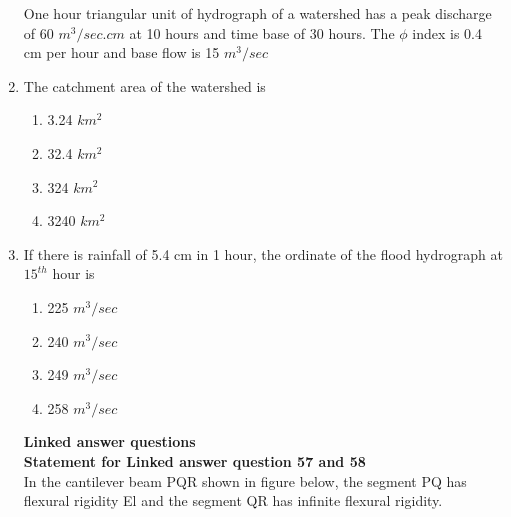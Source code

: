 \documentclass[journal]{IEEEtran}
\begin{document}
\begin{enumerate}
  One hour triangular unit of hydrograph of a watershed has a peak discharge of 60 $m^{3}/sec.cm$ at 10 hours and time base of 30 hours. The $\phi$ index is 0.4 cm per hour and base flow is 15 $m^{3}/sec$ 
  \item The catchment area of the watershed is 
  \begin{enumerate}
      \item 3.24 $km^{2}$
    \item 32.4 $km^{2}$
      \item 324 $km^{2}$
      \item 3240 $km^{2}$
  \end{enumerate}
  \item If there is rainfall of 5.4 cm in 1 hour, the ordinate of the flood hydrograph at $15^{th}$ hour is
  \begin{enumerate}
      \item 225 $m^{3}/sec$
      \item 240 $m^{3}/sec$
      \item 249 $m^{3}/sec$
      \item 258 $m^{3}/sec$ \\
  \end{enumerate}
  \textbf{Linked answer questions} \\
  \textbf{Statement for Linked answer question 57 and 58} \\
  In the cantilever beam PQR shown in figure below, the segment PQ has flexural rigidity El and the segment QR has infinite flexural rigidity.

  \begin{figure}[H]
			\centering
			
			
		\end{figure}


\end{enumerate}
\end{document}
